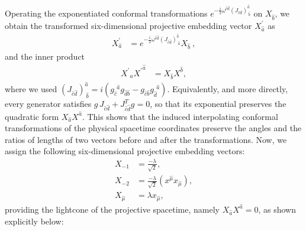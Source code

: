 \documentclass[foundations,article,submit,pdftex,moreauthors]{Definitions/mdpi}
\begin{document}
Operating the exponentiated conformal transformations $e^{-\frac{i}{2}\omega^{\hat{c}\hat{d}}(J_{\hat{c}\hat{d}})^{\hat{a}}_{~\hat{b}}}$ on $X_{\hat{b}}$, we obtain the transformed six-dimensional projective embedding vector $X^{\prime}_{\hat{a}}$ as
\begin{align}
\label{exponential-conformal-tranf}
  X^{\prime}_{\hat{a}}&=e^{-\frac{i}{2}\omega^{\hat{c}\hat{d}}(J_{\hat{c}\hat{d}})^{\hat{b}}_{~\hat{a}}}X_{\hat{b}}~,
\end{align}
and the inner product
\begin{align}
{X^{\prime}}_{\hat{a}}{X^{\prime}}^{\hat{a}} 
&= X_{\hat{b}}X^{\hat{b}},
\end{align}
where we used 
$(J_{{\hat{c}}{\hat{d}}})^{\hat{a}}_{~\hat{b}}=i(g_{\hat{c}}^{~~\hat{a}} g_{{\hat{d}}{\hat{b}}}-g_{{\hat{c}}{\hat{b}}} g_{\hat{d}}^{~~\hat{a}})$. 
{Equivalently, and more directly, every generator satisfies $g\,J_{\hat{c}\hat{d}}+J_{\hat{c}\hat{d}}^{T}g=0$, so that its exponential preserves the quadratic form $X_{\hat{a}}X^{\hat{a}}$.}
This shows that {the induced} interpolating conformal transformations {of the physical spacetime coordinates} preserve the angles and the ratios of lengths of two vectors before and after the transformations. Now, we assign the following six-dimensional projective embedding vectors:
\begin{align}
    {X}_{-1}&=\frac{-\lambda}{\sqrt{2}}, \nonumber\\
    {X}_{-2}&=\frac{-\lambda}{\sqrt{2}}(x^{\hat{\mu}}x_{\hat{\mu}}), \nonumber \\
     {X}_{\hat{\mu}}&=\lambda x_{\hat{\mu}},\label{X-mu}
\end{align}
providing the lightcone of the projective spacetime, namely ${X}_{\hat{a}}{X}^{\hat{a}}=0$, as shown explicitly below: 
\end{document}
